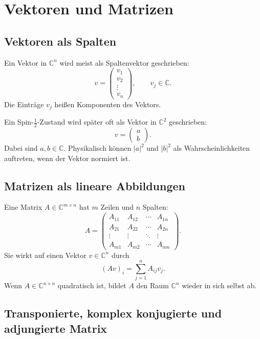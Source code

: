 \section{Vektoren und Matrizen}

\subsection{Vektoren als Spalten}

Ein Vektor in $\mathbb{C}^n$ wird meist als Spaltenvektor geschrieben:
\[
    v=
    \begin{pmatrix}
        v_1\\
        v_2\\
        \vdots\\
        v_n
    \end{pmatrix},
    \qquad v_j\in\mathbb{C}.
\]
Die Einträge $v_j$ heißen Komponenten des Vektors.

\begin{examplebox}
Ein Spin-$\frac12$-Zustand wird später oft als Vektor in $\mathbb{C}^2$ geschrieben:
\[
    v=\begin{pmatrix}a\\ b\end{pmatrix}.
\]
Dabei sind $a,b\in\mathbb{C}$. Physikalisch können $|a|^2$ und $|b|^2$ als Wahrscheinlichkeiten auftreten, wenn der Vektor normiert ist.
\end{examplebox}

\subsection{Matrizen als lineare Abbildungen}

Eine Matrix $A\in\mathbb{C}^{m\times n}$ hat $m$ Zeilen und $n$ Spalten:
\[
    A=
    \begin{pmatrix}
        A_{11} & A_{12} & \cdots & A_{1n}\\
        A_{21} & A_{22} & \cdots & A_{2n}\\
        \vdots & \vdots & \ddots & \vdots\\
        A_{m1} & A_{m2} & \cdots & A_{mn}
    \end{pmatrix}.
\]
Sie wirkt auf einen Vektor $v\in\mathbb{C}^n$ durch
\[
    (Av)_i = \sum_{j=1}^{n} A_{ij}v_j.
\]
Wenn $A\in\mathbb{C}^{n\times n}$ quadratisch ist, bildet $A$ den Raum $\mathbb{C}^n$ wieder in sich selbst ab.

\subsection{Transponierte, komplex konjugierte und adjungierte Matrix}

